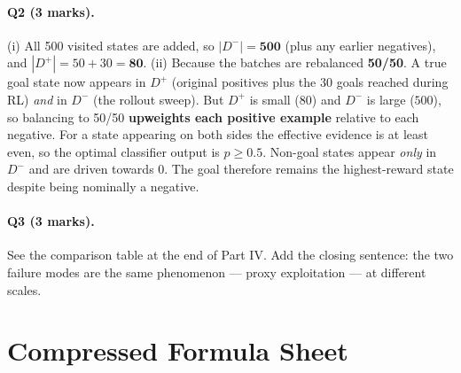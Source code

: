 \documentclass[11pt,a4paper]{article}
\begin{document}
\paragraph{Q2 (3 marks).}
(i) All 500 visited states are added, so $|D^-|=\mathbf{500}$ (plus any
earlier negatives), and $|D^+|=50+30=\mathbf{80}$.
(ii) Because the batches are rebalanced \textbf{50/50}. A true goal state now
appears in $D^+$ (original positives plus the 30 goals reached during RL)
\emph{and} in $D^-$ (the rollout sweep). But $D^+$ is small ($80$) and $D^-$
is large ($500$), so balancing to 50/50 \textbf{upweights each positive
example} relative to each negative. For a state appearing on both sides the
effective evidence is at least even, so the optimal classifier output is
$p\ge0.5$. Non-goal states appear \emph{only} in $D^-$ and are driven towards
$0$. The goal therefore remains the highest-reward state despite being
nominally a negative.

\paragraph{Q3 (3 marks).} See the comparison table at the end of Part IV.
Add the closing sentence: the two failure modes are the same phenomenon ---
proxy exploitation --- at different scales.

\newpage
\section{Compressed Formula Sheet}
\end{document}

